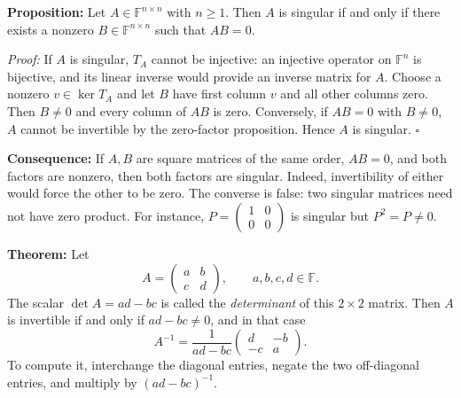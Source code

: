 \documentclass[a4paper,11pt,abstract=true]{scrartcl}
\theoremstyle{dotlessP}
\theoremstyle{dotlessS}
\theoremstyle{remark}
\theoremstyle{definition}
\begin{document}
\begin{problem_box}
\textbf{Proposition:}
Let $A\in\mathbb{F}^{n\times n}$ with $n\geq1$. Then $A$ is singular
if and only if there exists a nonzero $B\in\mathbb{F}^{n\times n}$
such that $AB=0$.

\end{problem_box}

\begin{claim_box}
\textit{Proof:} If $A$ is singular, $T_A$ cannot be injective:
an injective operator on $\mathbb{F}^n$ is bijective, and its linear
inverse would provide an inverse matrix for $A$. Choose a nonzero
$v\in\ker T_A$ and let $B$ have first column $v$ and all other
columns zero. Then $B\neq0$ and every column of $AB$ is zero.
Conversely, if $AB=0$ with $B\neq0$, $A$ cannot be invertible by
the zero-factor proposition. Hence $A$ is singular. \hfill$\square$
\end{claim_box}

\begin{claim_box}
\textbf{Consequence:} If $A,B$ are square matrices of the same
order, $AB=0$, and both factors are nonzero, then both factors are
singular. Indeed, invertibility of either would force the other to be
zero. The converse is false: two singular matrices need not have zero
product. For instance,
$P=\begin{pmatrix}1&0\\0&0\end{pmatrix}$ is singular but $P^2=P\neq0$.
\end{claim_box}

\begin{problem_box}
\textbf{Theorem:}
Let
\[
A=\begin{pmatrix}a&b\\c&d\end{pmatrix},\qquad a,b,c,d\in\mathbb{F}.
\]
The scalar $\det A=ad-bc$ is called the \emph{determinant} of this
$2\times2$ matrix. Then $A$ is invertible if and only if $ad-bc\neq0$,
and in that case
\[
\boxed{A^{-1}=\frac{1}{ad-bc}\begin{pmatrix}d&-b\\-c&a\end{pmatrix}.}
\]
To compute it, interchange the diagonal entries, negate the two
off-diagonal entries, and multiply by ${(ad-bc)}^{-1}$.
\end{problem_box}
\end{document}
